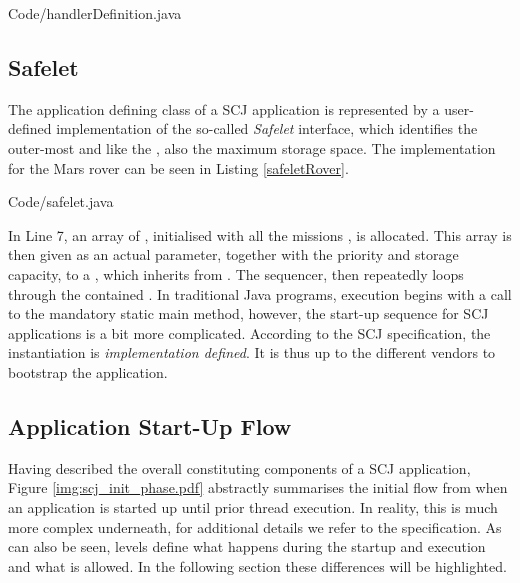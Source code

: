 
{Code/handlerDefinition.java}

\subsection{Safelet}
\label{subsection:safelet}
The application defining class of a SCJ application is represented by a user-defined implementation of the so-called \textit{Safelet} interface, which identifies the outer-most  and like the , also the maximum storage space. The  implementation for the Mars rover can be seen in Listing \ref{safeletRover}.


{Code/safelet.java}

In Line 7, an array of , initialised with all the missions , is allocated. This array is then given as an actual parameter, together with the priority and storage capacity, to a , which inherits from . The sequencer, then repeatedly loops through the contained . In traditional Java programs, execution begins with a call to the mandatory static main method, however, the start-up sequence for SCJ applications is a bit more complicated. According to the SCJ specification, the  instantiation is \textit{implementation defined}. It is thus up to the different vendors to bootstrap the application.

\subsection{Application Start-Up Flow}
Having described the overall constituting components of a SCJ application, Figure \ref{img:scj_init_phase.pdf} abstractly summarises the initial flow from when an application is started up until prior thread execution. In reality, this is much more complex underneath, for additional details we refer to the specification. As can also be seen, levels define what happens during the startup and execution and what is allowed. In the following section these differences will be highlighted.

